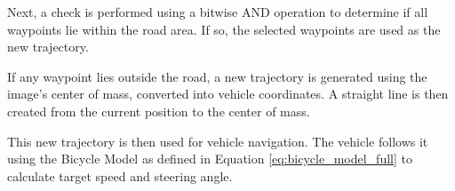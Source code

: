 \documentclass[conference]{IEEEtran}
\begin{document}
\par   
Next, a check is performed using a bitwise AND operation to determine if all waypoints lie within the road area. If so, the selected waypoints are used as the new trajectory.

\par  
If any waypoint lies outside the road, a new trajectory is generated using the image’s center of mass, converted into vehicle coordinates. A straight line is then created from the current position to the center of mass.

\par 
This new trajectory is then used for vehicle navigation. The vehicle follows it using the Bicycle Model as defined in Equation \ref{eq:bicycle_model_full} to calculate target speed and steering angle.





\end{document}

